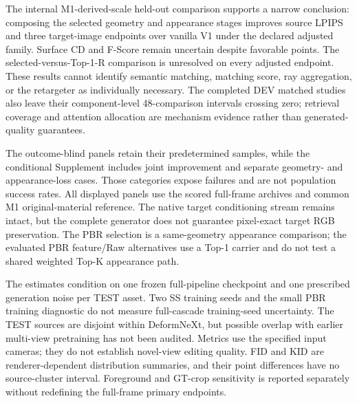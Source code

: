 The internal M1-derived-scale held-out comparison supports a narrow conclusion: composing the
selected geometry and appearance stages improves source LPIPS and three
target-image endpoints over vanilla V1 under the declared adjusted family.
Surface CD and F-Score remain uncertain despite favorable points. The
selected-versus-Top-1-R comparison is unresolved on every adjusted
endpoint. These results cannot identify semantic matching, matching score,
ray aggregation, or the retargeter as individually necessary. The completed
DEV matched studies also leave their component-level 48-comparison
intervals crossing zero; retrieval coverage and attention allocation are
mechanism evidence rather than generated-quality guarantees.

The outcome-blind panels retain their predetermined samples, while the
conditional Supplement includes joint improvement and separate geometry-
and appearance-loss cases. Those categories expose failures and are not
population success rates. All displayed panels use the scored full-frame
archives and common M1 original-material reference. The native target
conditioning stream remains intact, but the complete generator does not
guarantee pixel-exact target RGB preservation. The PBR selection is a
same-geometry appearance comparison; the evaluated PBR feature/Raw
alternatives use a Top-1 carrier and do not test a shared weighted Top-K
appearance path.

The estimates condition on one frozen full-pipeline checkpoint and one
prescribed generation noise per TEST asset. Two SS training seeds and the
small PBR training diagnostic do not measure full-cascade training-seed
uncertainty. The TEST sources are disjoint within DeformNeXt, but possible
overlap with earlier multi-view pretraining has not been audited. Metrics
use the specified input cameras; they do not establish novel-view editing
quality. FID and KID are renderer-dependent distribution summaries, and
their point differences have no source-cluster interval. Foreground and
GT-crop sensitivity is reported separately without redefining the
full-frame primary endpoints.
